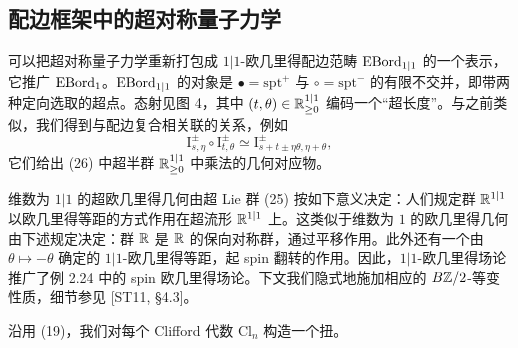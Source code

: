 \subsection{配边框架中的超对称量子力学}
可以把超对称量子力学重新打包成 $1|1$-欧几里得配边范畴 $\operatorname{EBord}_{1|1}$ 的一个表示，它推广 $\operatorname{EBord}_1$。$\operatorname{EBord}_{1|1}$ 的对象是 $\bullet=\mathrm{spt}^+$ 与 $\circ=\mathrm{spt}^-$ 的有限不交并，即带两种定向选取的超点。态射见图 4，其中 $(t,\theta)\in\mathbb{R}^{1|1}_{\ge0}$ 编码一个“超长度”。与之前类似，我们得到与配边复合相关联的关系，例如
\begin{equation}
\mathrm{I}^\pm_{s,\eta}\circ\mathrm{I}^\pm_{t,\theta}\simeq\mathrm{I}^\pm_{s+t\pm\eta\theta,\eta+\theta},
\tag{36}
\end{equation}
它们给出 (26) 中超半群 $\mathbb{R}^{1|1}_{\ge0}$ 中乘法的几何对应物。


\begin{remark}[3.17]
维数为 $1|1$ 的超欧几里得几何由超 Lie 群 (25) 按如下意义决定：人们规定群 $\mathbb{R}^{1|1}$ 以欧几里得等距的方式作用在超流形 $\mathbb{R}^{1|1}$ 上。这类似于维数为 $1$ 的欧几里得几何由下述规定决定：群 $\mathbb{R}$ 是 $\mathbb{R}$ 的保向对称群，通过平移作用。此外还有一个由 $\theta\mapsto-\theta$ 确定的 $1|1$-欧几里得等距，起 spin 翻转的作用。因此，$1|1$-欧几里得场论推广了例 2.24 中的 spin 欧几里得场论。下文我们隐式地施加相应的 $B\mathbb{Z}/2$-等变性质，细节参见 [ST11, §4.3]。
\end{remark}

沿用 (19)，我们对每个 Clifford 代数 $\mathrm{Cl}_n$ 构造一个扭。

